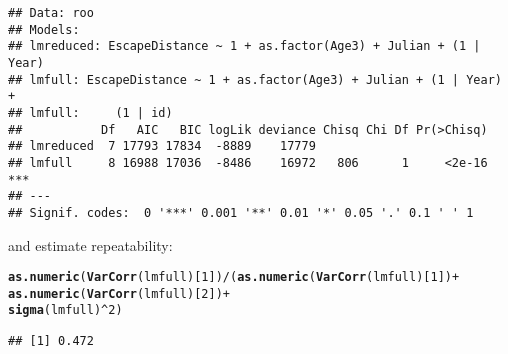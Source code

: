 \documentclass[12pt,a4paper]{scrartcl}\usepackage[]{graphicx}\usepackage[]{color}
\makeatletter
\newcommand{\hlnum}[1]{\textcolor[rgb]{0.686,0.059,0.569}{#1}}%
\newcommand{\hlopt}[1]{\textcolor[rgb]{0,0,0}{#1}}%
\newcommand{\hlstd}[1]{\textcolor[rgb]{0.345,0.345,0.345}{#1}}%
\newcommand{\hlkwd}[1]{\textcolor[rgb]{0.737,0.353,0.396}{\textbf{#1}}}%
\newenvironment{kframe}{%
 \def\at@end@of@kframe{}%
 \ifinner\ifhmode%
  \def\at@end@of@kframe{\end{minipage}}%
  \begin{minipage}{\columnwidth}%
 \fi\fi%
 \def\FrameCommand##1{\hskip\@totalleftmargin \hskip-\fboxsep
 \colorbox{shadecolor}{##1}\hskip-\fboxsep
     \hskip-\linewidth \hskip-\@totalleftmargin \hskip\columnwidth}%
 \MakeFramed {\advance\hsize-\width
   \@totalleftmargin\z@ \linewidth\hsize
   \@setminipage}}%
 {\par\unskip\endMakeFramed%
 \at@end@of@kframe}
\newenvironment{knitrout}{}{} %
\makeatother
\begin{document}
\begin{Answer}
\begin{knitrout}
\begin{kframe}
{\ttfamily\noindent\itshape\color{messagecolor}{\#\# refitting model(s) with ML (instead of REML)}}\begin{verbatim}
## Data: roo
## Models:
## lmreduced: EscapeDistance ~ 1 + as.factor(Age3) + Julian + (1 | Year)
## lmfull: EscapeDistance ~ 1 + as.factor(Age3) + Julian + (1 | Year) + 
## lmfull:     (1 | id)
##           Df   AIC   BIC logLik deviance Chisq Chi Df Pr(>Chisq)    
## lmreduced  7 17793 17834  -8889    17779                            
## lmfull     8 16988 17036  -8486    16972   806      1     <2e-16 ***
## ---
## Signif. codes:  0 '***' 0.001 '**' 0.01 '*' 0.05 '.' 0.1 ' ' 1
\end{verbatim}
\end{kframe}
\end{knitrout}

and estimate repeatability:
\begin{knitrout}
\color{fgcolor}\begin{kframe}
\begin{alltt}
\hlkwd{as.numeric}\hlstd{(}\hlkwd{VarCorr}\hlstd{(lmfull)[}\hlnum{1}\hlstd{])}\hlopt{/}\hlstd{(}\hlkwd{as.numeric}\hlstd{(}\hlkwd{VarCorr}\hlstd{(lmfull)[}\hlnum{1}\hlstd{])}\hlopt{+}
                                  \hlkwd{as.numeric}\hlstd{(}\hlkwd{VarCorr}\hlstd{(lmfull)[}\hlnum{2}\hlstd{])}\hlopt{+}
                                  \hlkwd{sigma}\hlstd{(lmfull)}\hlopt{^}\hlnum{2}\hlstd{)}
\end{alltt}
\begin{verbatim}
## [1] 0.472
\end{verbatim}
\end{kframe}
\end{knitrout}

\end{Answer}
\end{document}
